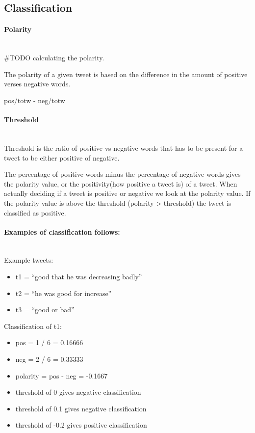 \subsection{Classification}

\paragraph{Polarity} 
\hspace{0pt}\\ 
#TODO calculating the polarity.  

The polarity of a given tweet is based on the difference in the amount of
positive verses negative words.

pos/totw - neg/totw 

\paragraph{Threshold} 
\hspace{0pt}\\ 
Threshold is the ratio of positive vs negative words that has to be present for a
tweet to be either positive of negative.

The percentage of positive words minus the percentage of negative words gives
the polarity value, or the positivity(how positive a tweet is) of a tweet. 
When actually deciding if a tweet is positive or negative we look at the
polarity value. If the polarity value is above the threshold (polarity >
threshold) the tweet is classified as positive. 

\paragraph{Examples of classification follows:} 
\hspace{0pt}\\ 
Example tweets:
\begin{itemize}
    \item t1 = “good that he was decreasing badly”
    \item t2 = “he was good for increase” 
    \item t3 = “good or bad”
\end{itemize}

Classification of t1:
\begin{itemize}
    \item pos = 1 / 6 = 0.16666
    \item neg = 2 / 6 = 0.33333
    \item polarity = pos - neg = -0.1667
    \item threshold of 0 gives negative classification
    \item threshold of 0.1 gives negative classification
    \item threshold of -0.2 gives positive classification
\end{itemize}

